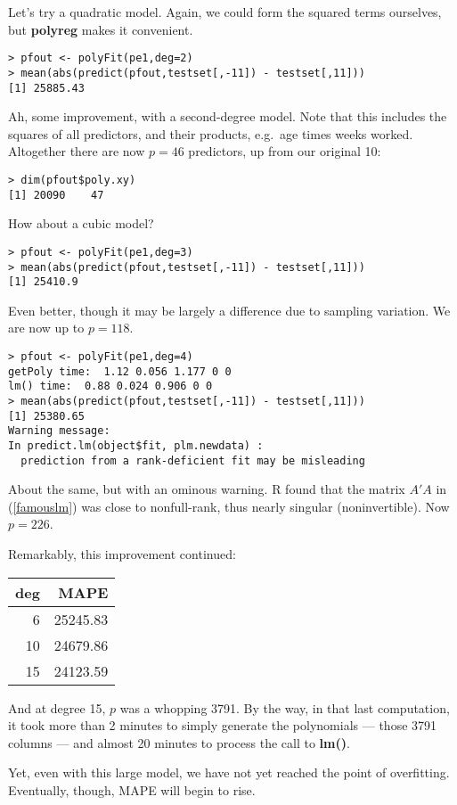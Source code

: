 Let's try a quadratic model.  Again, we could form the squared terms
ourselves, but \textbf{polyreg} makes it convenient.

\begin{lstlisting}
> pfout <- polyFit(pe1,deg=2)
> mean(abs(predict(pfout,testset[,-11]) - testset[,11]))
[1] 25885.43
\end{lstlisting}

Ah, some improvement, with a second-degree model.  Note that this
includes the squares of all predictors, and their products, e.g.\ age
times weeks worked.  Altogether there are now $p = 46$ predictors, up
from our original 10:

\begin{lstlisting}
> dim(pfout$poly.xy)
[1] 20090    47
\end{lstlisting}

How about a cubic model? 

\begin{lstlisting}
> pfout <- polyFit(pe1,deg=3)
> mean(abs(predict(pfout,testset[,-11]) - testset[,11]))
[1] 25410.9
\end{lstlisting}

Even better, though it may be largely a difference due to sampling
variation.  We are now up to $p = 118$.

\begin{lstlisting}
> pfout <- polyFit(pe1,deg=4)
getPoly time:  1.12 0.056 1.177 0 0 
lm() time:  0.88 0.024 0.906 0 0 
> mean(abs(predict(pfout,testset[,-11]) - testset[,11]))
[1] 25380.65
Warning message:
In predict.lm(object$fit, plm.newdata) :
  prediction from a rank-deficient fit may be misleading
\end{lstlisting}

About the same, but with an ominous warning.  R found that the matrix
$A'A$ in (\ref{famouslm}) was close to nonfull-rank, thus nearly
singular (noninvertible).  Now $p = 226$.

Remarkably, this improvement continued:

\bigskip

\begin{tabular}{|r|r|}
\hline
deg & MAPE \\
\hline
6 & 25245.83 \\
\hline
10 & 24679.86 \\
\hline
15 & 24123.59 \\
\hline
\end{tabular}

And at degree 15, $p$ was a whopping 3791.  By the way, in that last
computation, it took more than 2 minutes to simply generate the
polynomials --- those 3791 columns --- and almost 20 minutes to process
the call to \textbf{lm()}.

Yet, even with this large model, we have not yet reached the point of
overfitting.  Eventually, though, MAPE will begin to rise.

